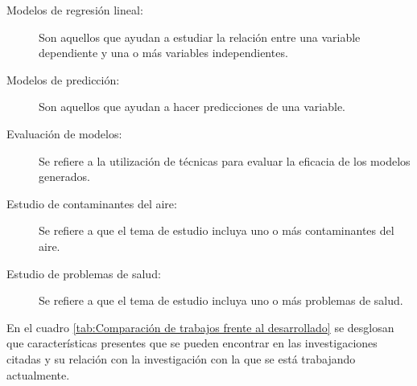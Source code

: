 \begin{description}
\item[Modelos de regresión lineal:]{Son aquellos que ayudan a estudiar la relación entre una variable dependiente y una o más variables independientes.}
\end{description}

\begin{description}
\item[Modelos de predicción:]{Son aquellos que ayudan a hacer predicciones de una variable.}
\end{description}

\begin{description}
\item[Evaluación de modelos:]{Se refiere a la utilización de técnicas para evaluar la eficacia de los modelos generados.}
\end{description}

\begin{description}
\item[Estudio de contaminantes del aire:]{Se refiere a que el tema de estudio incluya uno o más contaminantes del aire.}
\end{description}

\begin{description}
\item[Estudio de problemas de salud:]{Se refiere a que el tema de estudio incluya uno o más problemas de salud.}
\end{description}

En el cuadro \ref{tab:Comparación de trabajos frente al desarrollado} se desglosan que características presentes  que se pueden encontrar en las investigaciones citadas y su relación con la investigación con la que se está trabajando actualmente.\\

